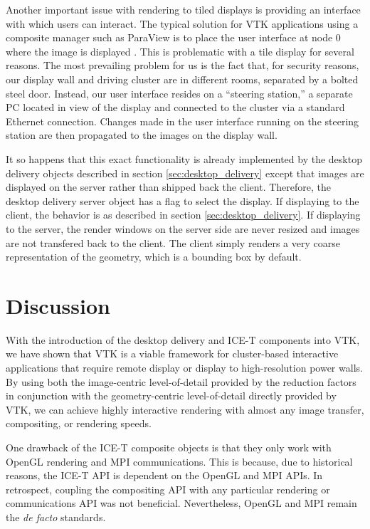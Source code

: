 \documentclass[twocolumn]{article}
\newcommand{\sticky}[1]{}
\begin{document}
Another important issue with rendering to tiled displays is providing an
interface with which users can interact.  The typical solution for VTK
applications using a composite manager such as ParaView is to place the
user interface at node 0 where the image is displayed \cite{Law01}.  This
is problematic with a tile display for several reasons.  The most
prevailing problem for us is the fact that, for security reasons, our
display wall and driving cluster are in different rooms, separated by a
bolted steel door.  Instead, our user interface resides on a ``steering
station,'' a separate PC located in view of the display and connected to
the cluster via a standard Ethernet connection.  Changes made in the user
interface running on the steering station are then propagated to the images
on the display wall.

It so happens that this exact functionality is already implemented by the
desktop delivery objects described in section \ref{sec:desktop_delivery}
except that images are displayed on the server rather than shipped back the
client.  Therefore, the desktop delivery server object has a flag to select
the display.  If displaying to the client, the behavior is as described in
section \ref{sec:desktop_delivery}.  If displaying to the server, the
render windows on the server side are never resized and images are not
transfered back to the client.  The client simply renders a very coarse
representation of the geometry, which is a bounding box by default.


\section{Discussion}
\label{sec:discussion}

With the introduction of the desktop delivery and ICE-T components into
VTK, we have shown that VTK is a viable framework for cluster-based
interactive applications that require remote display or display to
high-resolution power walls.  By using both the image-centric
level-of-detail provided by the reduction factors in conjunction with the
geometry-centric level-of-detail directly provided by VTK, we can achieve
highly interactive rendering with almost any image transfer, compositing,
or rendering speeds.  \sticky{Some empirical evidence, i.e. with LLNL data,
would probably be good here.  But that would suggest adding more figures,
increasing the size of the paper, and making review and release harder.
Doing this probably depends on the forum.}

One drawback of the ICE-T composite objects is that they only work with
OpenGL rendering and MPI communications.  This is because, due to
historical reasons, the ICE-T API is dependent on the OpenGL and MPI APIs.
In retrospect, coupling the compositing API with any particular rendering
or communications API was not beneficial.  Nevertheless, OpenGL and MPI
remain the \emph{de facto} standards.
\end{document}
